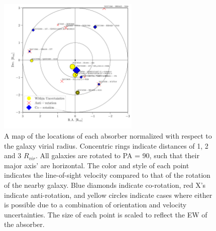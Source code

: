 \documentclass[iop]{emulateapj-rtx4}
\begin{document}
\begin{figure}[ht!]
        \centering
        \vspace{0pt}
        \includegraphics[width=0.60\textwidth]{SALT_map3.pdf}
        \caption{\small{A map of the locations of each absorber normalized with respect to the galaxy virial radius. Concentric rings indicate distances of 1, 2 and 3 $R_{vir}$. All galaxies are rotated to PA = 90, such that their major axis' are horizontal. The color and style of each point indicates the line-of-sight velocity compared to that of the rotation of the nearby galaxy. Blue diamonds indicate co-rotation, red X's indicate anti-rotation, and yellow circles indicate cases where either is possible due to a combination of orientation and velocity uncertainties. The size of each point is scaled to reflect the EW of the absorber. }}
        \label{map}
\end{figure}


\end{document}
